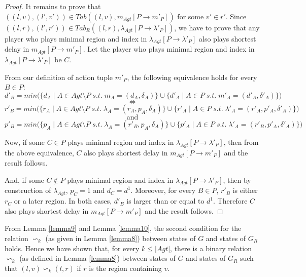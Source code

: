 \begin{proof}
It remains to prove that $((l, v), (l', v')) \in Tab((l, v), m_{Agt}[P \rightarrow m'_{P}])$ for some $v' \in r'$. Since $((l, r), (l', r')) \in Tab_{R}((l, r), \lambda_{Agt}[P \rightarrow \lambda'_{P}])$, we have to prove that any player who plays minimal region and index in $\lambda_{Agt}[P \rightarrow \lambda'_{P}]$ also plays shortest delay in $m_{Agt}[P \rightarrow m'_{P}]$. Let the player who plays minimal region and index in $\lambda_{Agt}[P \rightarrow \lambda'_{P}]$ be $C$.

From our definition of action tuple $m'_{P}$, the following equivalence holds for every $B \in P$:
\[d'_{B} = min\Big(\lbrace d_{A} \; \vert \; A \in Agt \setminus P \; s.t. \; m_{A} = (d_{A}, \delta_{A}) \rbrace \cup \lbrace d'_{A} \; \vert \; A \in P \; s.t. \; m'_{A} = (d'_{A}, \delta'_{A}) \rbrace\Big)\]
\[\Leftrightarrow\]
\[r'_{B} = min\Big(\lbrace r_{A} \; \vert \; A \in Agt \setminus P \; s.t. \; \lambda_{A} = (r_{A}, p_{A}, \delta_{A}) \rbrace \cup \lbrace r'_{A} \; \vert \; A \in P \; s.t. \; \lambda'_{A} = (r'_{A}, p'_{A}, \delta'_{A}) \rbrace\Big)\]
\[\text{and}\]
\[p'_{B} = min\Big(\lbrace p_{A} \; \vert \; A \in Agt \setminus P \; s.t. \; \lambda_{A} = (r'_{B}, p_{A}, \delta_{A}) \rbrace \cup \lbrace p'_{A} \; \vert \; A \in P \; s.t. \; \lambda'_{A} = (r'_{B}, p'_{A}, \delta'_{A}) \rbrace\Big)\]

Now, if some $C \in P$ plays minimal region and index in $\lambda_{Agt}[P \rightarrow \lambda'_{P}]$, then from the above equivalence, $C$ also plays shortest delay in $m_{Agt}[P \rightarrow m'_{P}]$ and the result follows.

And, if some $C \notin P$ plays minimal region and index in $\lambda_{Agt}[P \rightarrow \lambda'_{P}]$, then by construction of $\lambda_{Agt}$, $p_{C} = 1$ and $d_{C} = d^{1}$. Moreover, for every $B \in P$, $r'_{B}$ is either $r_{C}$ or a later region. In both cases, $d'_{B}$ is larger than or equal to $d^{1}$. Therefore $C$ also plays shortest delay in $m_{Agt}[P \rightarrow m'_{P}]$ and the result follows.
\end{proof}

From Lemma \ref{lemma9} and Lemma \ref{lemma10}, the second condition for the relation $\backsim_{k}$ (as given in Lemma \ref{lemma8}) between states of $G$ and states of $G_{R}$ holds. Hence we have shown that, for every $k \leq \vert Agt \vert$, there is a binary relation $\backsim_{k}$ (as defined in Lemma \ref{lemma8}) between states of $G$ and states of $G_{R}$ such that $(l, v) \backsim_{k} (l, r)$ if $r$ is the region containing $v$.

